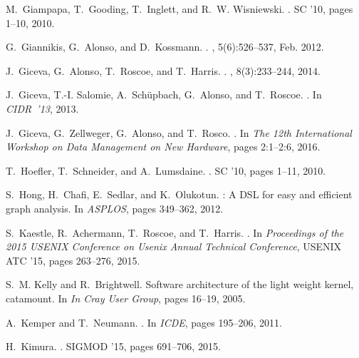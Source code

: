 \documentclass[11pt]{article}
\begin{document}
\begin{thebibliography}{10}
\begin{small}
M.~Giampapa, T.~Gooding, T.~Inglett, and R.~W. Wisniewski.
.
\newblock SC '10, pages 1--10, 2010.

G.~Giannikis, G.~Alonso, and D.~Kossmann.
.
, 5(6):526--537, Feb. 2012.

J.~Giceva, G.~Alonso, T.~Roscoe, and T.~Harris.
.
, 8(3):233--244, 2014.

J.~Giceva, T.-I. Salomie, A.~Sch{\"u}pbach, G.~Alonso, and T.~Roscoe.
.
\newblock In {\em CIDR~'13}, 2013.

J.~Giceva, G.~Zellweger, G.~Alonso, and T.~Rosco.
.
\newblock In {\em The 12th International Workshop on Data Management on New
  Hardware}, pages 2:1--2:6, 2016.

T.~Hoefler, T.~Schneider, and A.~Lumsdaine.
.
\newblock SC '10, pages 1--11, 2010.

S.~Hong, H.~Chafi, E.~Sedlar, and K.~Olukotun.
: A {DSL} for easy and efficient graph analysis.
\newblock In {\em ASPLOS}, pages 349--362, 2012.

S.~Kaestle, R.~Achermann, T.~Roscoe, and T.~Harris.
.
\newblock In {\em Proceedings of the 2015 USENIX Conference on Usenix Annual
  Technical Conference}, USENIX ATC '15, pages 263--276, 2015.

S.~M. Kelly and R.~Brightwell.
\newblock Software architecture of the light weight kernel, catamount.
\newblock In {\em In Cray User Group}, pages 16--19, 2005.

A.~Kemper and T.~Neumann.
.
\newblock In {\em ICDE}, pages 195--206, 2011.

H.~Kimura.
.
\newblock SIGMOD '15, pages 691--706, 2015.


\end{small}
\end{thebibliography}
\end{document}
